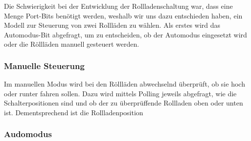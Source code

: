 Die Schwierigkeit bei der Entwicklung der Rollladenschaltung war, dass eine Menge Port-Bits benötigt werden, weshalb wir uns dazu entschieden haben, ein Modell zur Steuerung von zwei Rollläden zu wählen. Als erstes wird das Automodus-Bit abgefragt, um zu entscheiden, ob der Automodus eingesetzt wird oder die Röllläden manuell gesteuert werden.
\subsubsection{Manuelle Steuerung}
Im manuellen Modus wird bei den Röllläden abwechselnd überprüft, ob sie hoch oder runter fahren sollen. Dazu wird mittels Polling jeweils abgefragt, wie die Schalterpositionen sind und ob der zu überprüffende Rollladen oben oder unten ist. Dementsprechend ist die Rollladenposition 
\subsubsection{Audomodus}
